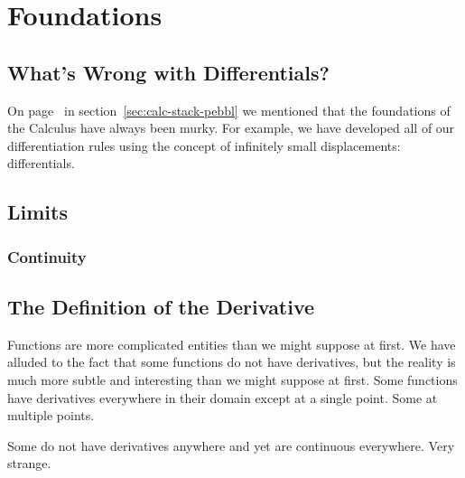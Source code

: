 \chapter{Foundations}
\label{cha:foundations}

\section{What's Wrong with Differentials?}
\label{sec:whats-wrong-with}
On page~\pageref{MurkyFoundation} in
section~\ref{sec:calc-stack-pebbl} we mentioned that the foundations
of the Calculus have always been murky. For example, we have developed
all of our differentiation rules using the concept of  infinitely
small displacements: differentials.

\section{Limits}
\label{sec:limits}
\aptta{}
\endaptta{}
\subsection{Continuity}
\label{subsec:continuity}
\section{The Definition of the Derivative}
\label{sec:defin-deriv}
\aptta{}
Functions are more complicated entities than we might suppose at
first. We have alluded to the fact that some functions do not have
derivatives, but the reality is much more subtle and interesting
than we might suppose at first. Some functions have derivatives
everywhere in their domain except at a single point. Some at multiple
points. 

Some do not have derivatives anywhere and yet are continuous
everywhere. Very strange.

